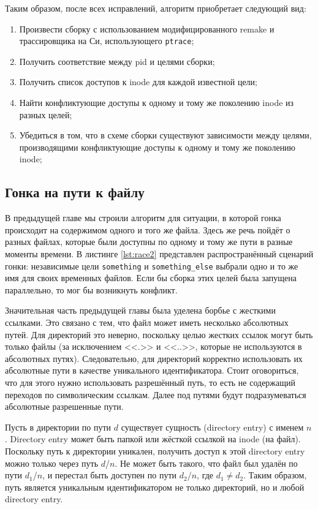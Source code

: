 Таким образом, после всех исправлений, алгоритм приобретает следующий вид:

\begin{enumerate}
	\item Произвести сборку с использованием модифицированного remake и трассировщика на Си, использующего \texttt{ptrace};
	\item Получить соответствие между pid и целями сборки;
	\item Получить список доступов к inode для каждой известной цели;
	\item Найти конфликтующие доступы к одному и тому же поколению inode из разных целей;
	\item Убедиться в том, что в схеме сборки существуют зависимости между целями, производящими конфликтующие доступы к одному и тому же поколению inode;
\end{enumerate}

\subsection{Гонка на пути к файлу}
\label{subsec:path-race}



В предыдущей главе мы строили алгоритм для ситуации, в которой гонка происходит на содержимом одного и того же файла. Здесь же речь пойдёт о разных файлах, которые были доступны по одному и тому же пути в разные моменты времени. В листинге \ref{lst:race2} представлен распространённый сценарий гонки: независимые цели \texttt{something} и \texttt{something\_else} выбрали одно и то же имя для своих временных файлов. Если бы сборка этих целей была запущена параллельно, то мог бы возникнуть конфликт.

Значительная часть предыдущей главы была уделена борбье с жесткими ссылками. Это связано с тем, что файл может иметь несколько абсолютных путей. Для директорий это неверно, поскольку целью жестких ссылок могут быть только файлы (за исключением <<.>> и <<..>>, которые не используются в абсолютных путях). Следовательно, для директорий корректно использовать их абсолютные пути в качестве уникального идентификатора. Стоит оговориться, что для этого нужно использовать разрешённый путь, то есть не содержащий переходов по символическим ссылкам. Далее под путями будут подразумеваться абсолютные разрешенные пути.

Пусть в директории по пути $d$ существует сущность (directory entry) с именем $n$. Directory entry может быть папкой или жёсткой ссылкой на inode (на файл). Поскольку путь к директории уникален, получить доступ к этой directory entry можно только через путь $d$/$n$. Не может быть такого, что файл был удалён по пути $d_1$/$n$, и перестал быть доступен по пути $d_2$/$n$, где $d_1 \ne d_2$. Таким образом, путь является уникальным идентификатором не только директорий, но и любой directory entry.

